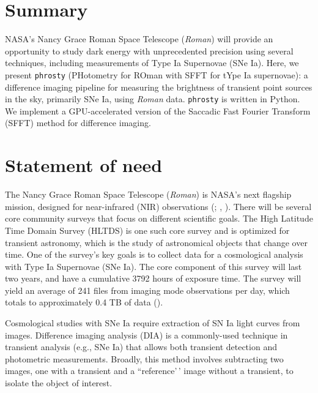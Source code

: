\documentclass[10pt,a4paper,onecolumn]{article}
\begin{document}
\section{Summary}\label{summary}

NASA's Nancy Grace Roman Space Telescope (\emph{Roman}) will provide an
opportunity to study dark energy with unprecedented precision using
several techniques, including measurements of Type Ia Supernovae (SNe
Ia). Here, we present \texttt{phrosty} (PHotometry for ROman with SFFT
for tYpe Ia supernovae): a difference imaging pipeline for measuring the
brightness of transient point sources in the sky, primarily SNe Ia,
using \emph{Roman} data. \texttt{phrosty} is written in Python. We
implement a GPU-accelerated version of the Saccadic Fast Fourier
Transform (SFFT) method for difference imaging.

\section{Statement of need}\label{statement-of-need}

The Nancy Grace Roman Space Telescope (\emph{Roman}) is NASA's next
flagship mission, designed for near-infrared (NIR) observations
(;
,
). There will be several core community
surveys that focus on different scientific goals. The High Latitude Time
Domain Survey (HLTDS) is one such core survey and is optimized for
transient astronomy, which is the study of astronomical objects that
change over time. One of the survey's key goals is to collect data for a
cosmological analysis with Type Ia Supernovae (SNe Ia). The core
component of this survey will last two years, and have a cumulative 3792
hours of exposure time. The survey will yield an average of 241 files
from imaging mode observations per day, which totals to approximately
0.4 TB of data ().

Cosmological studies with SNe Ia require extraction of SN Ia light
curves from images. Difference imaging analysis (DIA) is a commonly-used
technique in transient analysis (e.g., SNe Ia) that allows both
transient detection and photometric measurements. Broadly, this method
involves subtracting two images, one with a transient and a
``reference'\,' image without a transient, to isolate the object of
interest.
\end{document}
